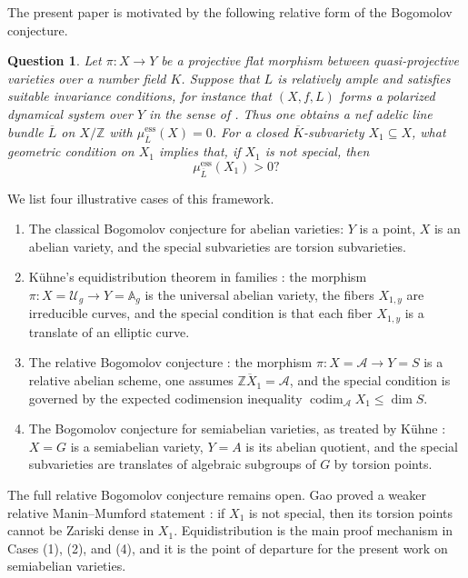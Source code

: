 \documentclass[10pt,a4paper]{amsart}
\theoremstyle{plain}
\theoremstyle{plain}
\newtheorem{ques}[thm]{Question} \newtheorem{prop}[thm]{Proposition}
\numberwithin{equation}{section}
\begin{document}
The present paper is motivated by the following relative form of the
Bogomolov conjecture.
\begin{ques}
	Let \(\pi:X\to Y\) be a projective flat morphism between quasi-projective
	varieties over a number field \(K\).  Suppose that \(L\) is relatively ample
	and satisfies suitable invariance conditions, for instance that \((X,f,L)\)
	forms a polarized dynamical system over \(Y\) in the sense of \cite{YZ}.  Thus
	one obtains a nef adelic line bundle \(\overline L\) on \(X/\mathbb Z\) with
	\(\mu^{\mathrm{ess}}_{\overline L}(X)=0\).  For a closed
	\(\overline K\)-subvariety \(X_1\subseteq X\), what geometric condition on
	\(X_1\) implies that, if \(X_1\) is not special, then
	\[
	\mu^{\mathrm{ess}}_{\overline L}(X_1)>0?
	\]
\end{ques}

We list four illustrative cases of this framework.
\begin{enumerate}[label=\textup{(\arabic*)},leftmargin=2em]
	\item The classical Bogomolov conjecture for abelian varieties: \(Y\) is a
	point, \(X\) is an abelian variety, and the special subvarieties are torsion
	subvarieties.
	\item K\"uhne's equidistribution theorem in families \cite{Ku4}: the morphism
	\(\pi:X=\mathscr U_g\to Y=\mathbb A_g\) is the universal abelian variety, the
	fibers \(X_{1,y}\) are irreducible curves, and the special condition is that
	each fiber \(X_{1,y}\) is a translate of an elliptic curve.
	\item The relative Bogomolov conjecture \cite{DGH2}: the morphism
	\(\pi:X=\mathcal A\to Y=S\) is a relative abelian scheme, one assumes
	\(\overline{\mathbb Z X_1}=\mathcal A\), and the special condition is governed
	by the expected codimension inequality
	\(\operatorname{codim}_{\mathcal A}X_1\leq\dim S\).
	\item The Bogomolov conjecture for semiabelian varieties, as treated by
	K\"uhne \cite{Ku1}: \(X=G\) is a semiabelian variety, \(Y=A\) is its abelian
	quotient, and the special subvarieties are translates of algebraic subgroups
	of \(G\) by torsion points.
\end{enumerate}


The full relative Bogomolov conjecture remains open.  Gao proved a weaker
relative Manin--Mumford statement \cite{Gao}: if \(X_1\) is not special, then
its torsion points cannot be Zariski dense in \(X_1\).  Equidistribution is the
main proof mechanism in Cases (1), (2), and (4), and it is the point of
departure for the present work on semiabelian varieties.
\end{document}
